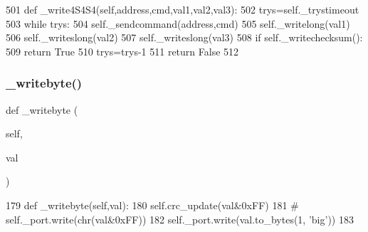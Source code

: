 \begin{DoxyCode}
501     \textcolor{keyword}{def }\_write4S4S4(self,address,cmd,val1,val2,val3):
502         trys=self.\_trystimeout
503         \textcolor{keywordflow}{while} trys:
504             self.\_sendcommand(address,cmd)
505             self.\_writelong(val1)
506             self.\_writeslong(val2)
507             self.\_writeslong(val3)
508             \textcolor{keywordflow}{if} self.\_writechecksum():
509                 \textcolor{keywordflow}{return} \textcolor{keyword}{True}
510             trys=trys-1
511         \textcolor{keywordflow}{return} \textcolor{keyword}{False}
512 
\end{DoxyCode}
\mbox{\label{classtoxic__hardware_1_1roboclaw__3_1_1Roboclaw_a20ef100ec6c3b82b97d4763f61ae785b}} 
\subsubsection{\texorpdfstring{\+\_\+writebyte()}{\_writebyte()}}
{\footnotesize\ttfamily def \+\_\+writebyte (\begin{DoxyParamCaption}\item[{}]{self,  }\item[{}]{val }\end{DoxyParamCaption})\hspace{0.3cm}{\ttfamily [private]}}


\begin{DoxyCode}
179     \textcolor{keyword}{def }\_writebyte(self,val):
180         self.crc\_update(val&0xFF)
181 \textcolor{comment}{#       self.\_port.write(chr(val&0xFF))}
182         self.\_port.write(val.to\_bytes(1, \textcolor{stringliteral}{'big'}))
183 
\end{DoxyCode}
\mbox{\label{classtoxic__hardware_1_1roboclaw__3_1_1Roboclaw_af64933c3b7db755b6709d9aaba340aec}} 
